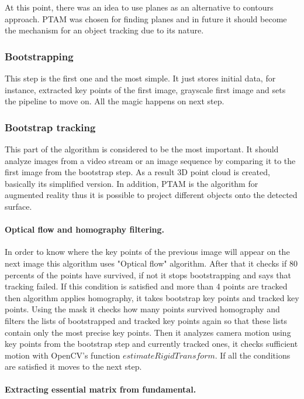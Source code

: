 \documentclass[../../main]{subfiles}
\begin{document}
At this point, there was an idea to use planes as an alternative to contours approach. \ac{PTAM} was chosen for finding planes and in future it should become the mechanism for an object tracking due to its nature.

\subsubsection{Bootstrapping}

This step is the first one and the most simple. It just stores initial data, for instance, extracted key points of the first image, grayscale first image and sets the pipeline to move on. All the magic happens on next step.

\subsubsection{Bootstrap tracking}

This part of the algorithm is considered to be the most important. It should analyze images from a video stream or an image sequence by comparing it to the first image from the bootstrap step. As a result 3D point cloud is created, basically its simplified version. In addition, \ac{PTAM} is the algorithm for augmented reality thus it is possible to project different objects onto the detected surface.

\paragraph*{Optical flow and homography filtering.}

In order to know where the key points of the previous image will appear on the next image this algorithm uses "Optical flow" algorithm. After that it checks if 80 percents of the points have survived, if not it stops bootstrapping and says that tracking failed. If this condition is satisfied and more than 4 points are tracked then algorithm applies homography, it takes bootstrap key points and tracked key points. Using the mask it checks how many points survived homography and filters the lists of bootstrapped and tracked key points again so that these lists contain only the most precise key points. Then it analyzes camera motion using key points from the bootstrap step and currently tracked ones, it checks sufficient motion with \ac{OpenCV}'s function $estimateRigidTransform$. If all the conditions are satisfied it moves to the next step.

\paragraph*{Extracting essential matrix from fundamental.}
\end{document}
